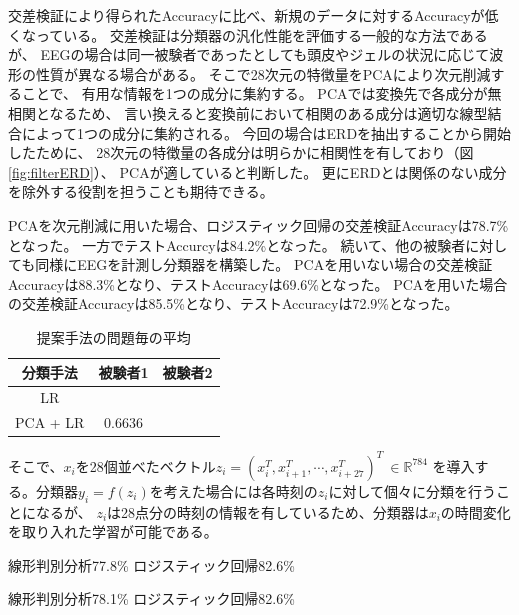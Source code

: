 交差検証により得られたAccuracyに比べ、新規のデータに対するAccuracyが低くなっている。
交差検証は分類器の汎化性能を評価する一般的な方法であるが、
EEGの場合は同一被験者であったとしても頭皮やジェルの状況に応じて波形の性質が異なる場合がある。
そこで28次元の特徴量をPCAにより次元削減することで、
有用な情報を1つの成分に集約する。
PCAでは変換先で各成分が無相関となるため、
言い換えると変換前において相関のある成分は適切な線型結合によって1つの成分に集約される。
今回の場合はERDを抽出することから開始したために、
28次元の特徴量の各成分は明らかに相関性を有しており（図\ref{fig:filterERD}）、
PCAが適していると判断した。
更にERDとは関係のない成分を除外する役割を担うことも期待できる。

PCAを次元削減に用いた場合、ロジスティック回帰の交差検証Accuracyは78.7\%となった。
一方でテストAccurcyは84.2\%となった。
続いて、他の被験者に対しても同様にEEGを計測し分類器を構築した。
PCAを用いない場合の交差検証Accuracyは88.3\%となり、テストAccuracyは69.6\%となった。
PCAを用いた場合の交差検証Accuracyは85.5\%となり、テストAccuracyは72.9\%となった。

\begin{table}[t]
    \centering
    \caption{提案手法の問題毎の平均}
    \begin{tabular}{|c|c|c|} \hline
        分類手法 & 被験者1 & 被験者2 \\ \hline
        LR &  & \\ \hline
        PCA + LR & 0.6636 & \\ \hline
    \end{tabular}
    \label{table:meanacc}
\end{table}

そこで、\(x_i\)を28個並べたベクトル\(z_i=(x_i^T, x_{i+1}^T,\cdots, x_{i+27}^T)^T\ \in \mathbb R^{784}\)
を導入する。分類器\(y_i=f(z_i)\)を考えた場合には各時刻の\(z_i\)に対して個々に分類を行うことになるが、
\(z_i\)は28点分の時刻の情報を有しているため、分類器は\(x_i\)の時間変化を取り入れた学習が可能である。

線形判別分析77.8\%
ロジスティック回帰82.6\%

線形判別分析78.1\%
ロジスティック回帰82.6\%